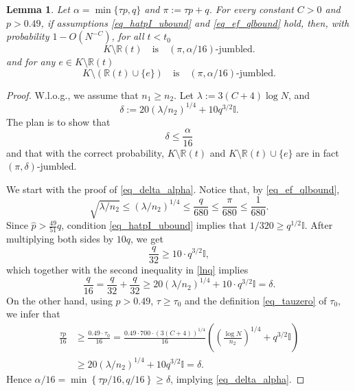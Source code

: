 \documentclass[12pt,reqno]{amsart}
\newcommand{\R} {\mathbb R}
\newcommand{\I} {\mathbb I}
\newtheorem{lemma}[theorem]{Lemma}
\theoremstyle{definition}
\begin{document}
\begin{lemma}
	\label{lem_quasiRt}
Let  $\alpha = \min \{ \tau p, q \}$ and $\pi := \tau p + q$. For every constant $C > 0$ and $p > 0.49$, if assumptions \eqref{eq_hatpI_ubound} and \eqref{eq_ef_qlbound} hold,	then, with probability $1 - O(N^{-C })$, for all $t < t_0$
\begin{equation*}
	K \setminus \R(t)\quad \text{is} \quad(\pi, \alpha/16)\text{-jumbled}.
\end{equation*}
and for any $e \in K \setminus \R(t)$
\begin{equation*}
  K \setminus (\R(t) \cup \{ e \}) \quad \text{is} \quad(\pi, \alpha/16)\text{-jumbled}.
\end{equation*}
\end{lemma}
\begin{proof}
  W.l.o.g., we assume that $n_1\ge n_2$. Let $\lambda := 3(C + 4)\log N$, and
		\begin{equation}
		  \label{eq_cond_quasiRt}
		\delta := 20 \left( \lambda/n_2 \right)^{1/4} + 10q^{3/2}\I.
		\end{equation}
The plan is to show that
\begin{equation}
	\delta \le \frac{\alpha}{16}
	\label{eq_delta_alpha}
\end{equation}
and that with the correct probability, $K \setminus \R(t)$ and $K \setminus \R(t) \cup \{e\}$ are in fact $(\pi, \delta)$-jumbled.

		
We start with the proof of \eqref{eq_delta_alpha}.
Notice that,
by \eqref{eq_ef_qlbound},
\begin{equation}
  \label{lnq}
\sqrt{\lambda/{n_2}}\le\left(\lambda/{n_2}\right)^{1/4}\le\frac q{680}\le\frac\pi{680}\le\frac1{680}.
\end{equation}
Since $\hat p > \tfrac{49}{51}q$,
condition \eqref{eq_hatpI_ubound} implies that
$1/320 \ge q^{1/2} \I$. After multiplying both sides by  $10q$, we get
\begin{equation*}
  \frac q{32} \ge 10\cdot q^{3/2} \I,
\end{equation*}
which together with the second inequality in \eqref{lnq} implies
\begin{equation*}
	\frac{q}{16} = \frac{q}{32} + \frac{q}{32} \ge 20 \left( \lambda/{n_2} \right)^{1/4} + 10\cdot q^{3/2} \I = \delta.
\end{equation*}
On the other hand, using $p > 0.49$, $\tau \ge \tau_0$  and the definition \eqref{eq_tauzero} of $\tau_0$, we infer that
\begin{align*}
  \frac{\tau p}{16} &\ge \frac{0.49 \cdot \tau_0}{16} = \frac{0.49 \cdot 700\cdot (3(C + 4))^{1/4}}{16} \left( \left(\frac{\log N}{n_2}\right)^{1/4} + q^{3/2} \I\right) \\
	&\ge 20 \left( \lambda/{n_2} \right)^{1/4} + 10q^{3/2} \I = \delta.
\end{align*}
Hence $\alpha/16 = \min \left\{ \tau p/16, q/16 \right\} \ge \delta$, implying \eqref{eq_delta_alpha}.


\end{proof}
\end{document}
